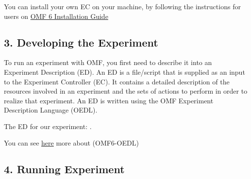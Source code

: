 \documentclass[letterpaper,10pt,english]{sphinxmanual}
\begin{document}
You can install your own EC on your machine, by following the instructions for users on \href{http://mytestbed.net/doc/omf/file.INSTALLATION.html}{OMF 6 Installation Guide}


\subsection{3. Developing the Experiment}
\label{omf_example:developing-the-experiment}
To run an experiment with OMF, you first need to describe it into an Experiment Description (ED). An ED is a file/script that is supplied as an input to the Experiment Controller (EC). It contains a detailed description of the resources involved in an experiment and the sets of actions to perform in order to realize that experiment. An ED is written using the OMF Experiment Description Language (OEDL).

The ED for our experiment: .

You can see \href{http://omf.mytestbed.net/projects/omf6/wiki/OEDLOMF6}{here}  more about (OMF6-OEDL)


\subsection{4. Running Experiment}
\label{omf_example:running-experiment}
\end{document}
